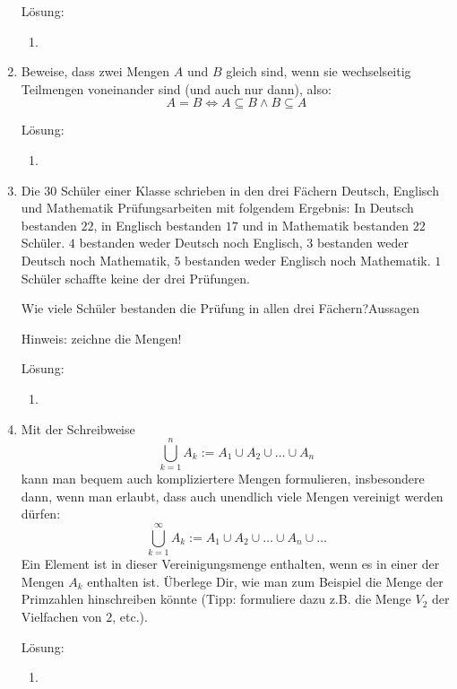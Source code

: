 \documentclass[main.tex]{subfiles}
\begin{document}
\begin{enumerate}
	      Lösung:
	      \begin{enumerate}
		      \item
	      \end{enumerate}
	\item Beweise, dass zwei Mengen \( A \) und \( B \) gleich sind,
	      wenn sie wechselseitig Teilmengen voneinander sind (und auch nur dann),
	      also:
	      \[ A = B \Leftrightarrow A \subseteq B \land B \subseteq A \]

	      Lösung:
	      \begin{enumerate}
		      \item
	      \end{enumerate}
	\item Die \( 30 \) Schüler einer Klasse schrieben in den drei Fächern
	      Deutsch, Englisch und Mathematik Prüfungsarbeiten mit folgendem Ergebnis:
	      In Deutsch bestanden \( 22 \), in Englisch bestanden \( 17 \)
	      und in Mathematik bestanden \( 22 \) Schüler.
	      \( 4 \) bestanden weder Deutsch noch Englisch,
	      \( 3 \) bestanden weder Deutsch noch Mathematik,
	      \( 5 \) bestanden weder Englisch noch Mathematik.
	      \( 1 \) Schüler schaffte keine der drei Prüfungen.

	      Wie viele Schüler bestanden die Prüfung in allen drei Fächern?Aussagen

	      Hinweis: zeichne die Mengen!

	      Lösung:
	      \begin{enumerate}
		      \item
	      \end{enumerate}
	\item Mit der Schreibweise
	      \[ \bigcup_{k = 1}^{n} A_k := A_1 \cup A_2 \cup \dots \cup A_n \]
	      kann man bequem auch kompliziertere Mengen formulieren, insbesondere dann, wenn man
	      erlaubt, dass auch unendlich viele Mengen vereinigt werden dürfen:
	      \[ \bigcup_{k = 1}^{\infty} A_k := A_1 \cup A_2 \cup \dots \cup A_n \cup \dots \]
	      Ein Element ist in dieser Vereinigungsmenge enthalten, wenn es in einer der Mengen \( A_k \) enthalten ist.
	      Überlege Dir, wie man zum Beispiel die Menge der Primzahlen hinschreiben könnte
	      (Tipp: formuliere dazu z.B. die Menge \( V_2 \) der Vielfachen von \( 2 \), etc.).

	      Lösung:
	      \begin{enumerate}
		      \item
	      \end{enumerate}
\end{enumerate}
\end{document}
